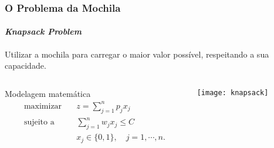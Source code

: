 \documentclass[10pt,fleqn]{beamer}
\begin{document}
\begin{frame}
  \frametitle{O Problema da Mochila} %
  \framesubtitle{\textit{Knapsack Problem}}
  Utilizar a mochila para carregar o maior valor possível, respeitando a sua
  capacidade.
  \begin{columns}[T]
	  \begin{column}{.5\textwidth}
      \begin{block}{Modelagem matemática}
	    { \footnotesize
        \begin{align*}
          \textrm{maximizar} \quad
		  	& z = \sum_{j=1}^n p_j x_j \\
          \textrm{sujeito a} \quad
		  	& \sum_{j=1}^n w_{j}x_j \leq C \\
            & {x_j \in \{0,1\}, \quad j=1,\cdots,n.}
        \end{align*}
		}
      \end{block}
    \end{column}
    \begin{column}{.5\textwidth}
	  \begin{center}
        \texttt{[image: knapsack]}
	  \end{center}
    \end{column}
  \end{columns}
\end{frame}
\end{document}
